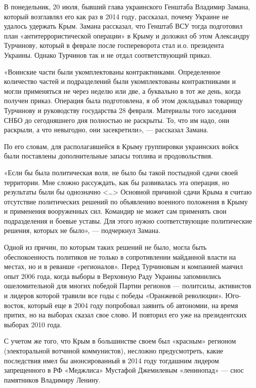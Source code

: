 В понедельник, 20 июля, бывший глава украинского Генштаба Владимир Замана, который возглавлял его как раз в 2014 году, рассказал, почему Украине не удалось удержать Крым. Замана рассказал, что Генштаб ВСУ тогда подготовил план «антитеррористической операции» в Крыму и доложил об этом Александру Турчинову, который в феврале после госпереворота стал и.о. президента Украины. Однако Турчинов так и не отдал соответствующий приказ.

«Воинские части были укомплектованы контрактниками. Определенное количество
частей и подразделений были укомплектованы контрактниками и могли применяться
не через неделю или две, а буквально в тот же день, когда получен приказ.
Операция была подготовлена, я об этом докладывал товарищу Турчинову и
руководству государства 28 февраля. Материалы того заседания СНБО до
сегодняшнего дня полностью не раскрыты. То, что им надо, они раскрыли, а что
невыгодно, они засекретили», --- рассказал Замана.

По его словам, для располагавшейся в Крыму группировки украинских войск были
поставлены дополнительные запасы топлива и продовольствия.

«Если бы была политическая воля, не было бы такой постыдной сдачи своей
территории. Мне сложно рассуждать, как бы развивалась эта операция, но
результаты были бы однозначно <…> Основной причиной сдачи Крыма я считаю
отсутствие политических решений по объявлению военного положения в Крыму и
применения вооруженных сил. Командир не может сам применять свои подразделения
и боевые уставы. Для этого нужно соответствующие политические решения, которых
не было», --- подчеркнул Замана.

Одной из причин, по которым таких решений не было, могла быть обеспокоенность
политиков не только в сопротивлении майданной власти на местах, но и в реванше
«регионалов». Перед Турчиновым и компанией маячил опыт 2006 года, когда выборы
в Верховную Раду Украины запомнились ошеломительной для многих победой Партии
регионов --- политсилы, активистов и лидеров которой травили все годы с победы
«Оранжевой революции». Юго-восток, который еще в 2004 году попробовал заявить
об автономии, на время притих, но на выборах сказал свое слово. И повторил его
уже на президентских выборах 2010 года.

С учетом же того, что Крым в большинстве своем был «красным» регионом
(электоральной вотчиной коммунистов), несложно предусмотреть, какие последствия
имел бы анонсированный в 2014 году тогдашним лидером запрещенного в РФ
«Меджлиса» Мустафой Джемилевым «ленинопад» --- снос памятников Владимиру
Ленину.

